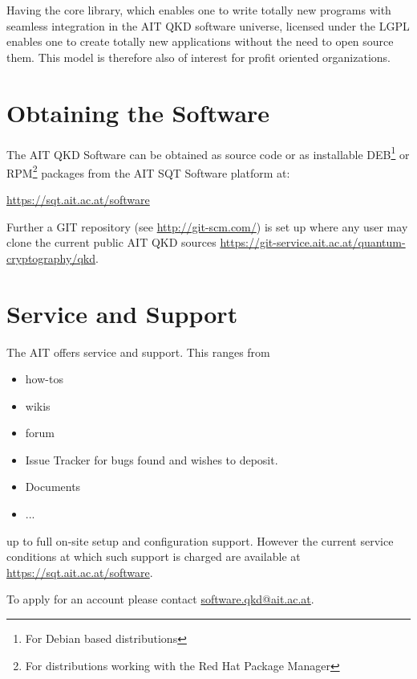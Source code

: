 \medskip

Having the core library, which enables one to write totally new programs with seamless integration in the AIT QKD software universe, licensed under the LGPL enables one to create totally new applications without the need to open source them. This model is therefore also of interest for profit oriented organizations.

\section{Obtaining the Software}
\label{sec:Obtaining the Software}

The AIT QKD Software can be obtained as source code or as installable DEB\footnote{For Debian based distributions} or RPM\footnote{For distributions working with the Red Hat Package Manager} packages from the AIT SQT Software platform at:

\medskip

\begin{center}
\url{https://sqt.ait.ac.at/software}
\end{center}

Further a GIT repository (see \href{http://git-scm.com}{http://git-scm.com/}) is set up where any user may clone the current public AIT QKD sources \url{https://git-service.ait.ac.at/quantum-cryptography/qkd}. 

\section{Service and Support}
\label{sec:Service and Support}

The AIT offers service and support. This ranges from 

\begin{itemize}

    \item how-tos
    
    \item wikis
    
    \item forum
    
    \item Issue Tracker for bugs found and wishes to deposit.
    
    \item Documents
    
    \item ...

\end{itemize}

up to full on-site setup and configuration support. However the current service conditions at which such support is charged are available at \url{https://sqt.ait.ac.at/software}.

\medskip

To apply for an account please contact \href{mailto:software.qkd@ait.ac.at}{software.qkd@ait.ac.at}.
